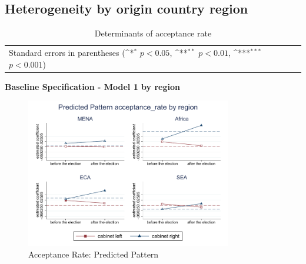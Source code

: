 \documentclass[10pt,a4paper]{scrartcl}
\begin{document}

\clearpage
\FloatBarrier
\subsection{Heterogeneity by origin country region}
\begin{table}[!ht]\centering
	\renewcommand{\arraystretch}{1.25}
	\small
	\def\sym#1{\ifmmode^{#1}\else\(^{#1}\)\fi}
	\caption{Determinants of acceptance rate}
	\begin{tabular}{l*{4}{c}}
		\hline\hline
		
		\hline\hline
		\multicolumn{5}{l}{\footnotesize Standard errors in parentheses (\sym{*} \(p<0.05\), \sym{**} \(p<0.01\), \sym{***} \(p<0.001\))}\\
	\end{tabular}
\end{table}

\clearpage
\textbf{Baseline Specification - Model 1 by region}
\begin{figure}[!ht]
	\centering
	\includegraphics[width=0.8\textwidth]{figures_edited/acceptance_rate_graph1_by_region.pdf}
	\caption{Acceptance Rate: Predicted Pattern}
\end{figure}
\end{document}
